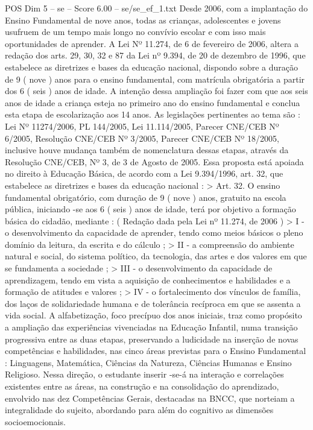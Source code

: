 \begin{textsample}{POS Dim 5 – se – Score 6.00 – se/se\_ef\_1.txt}
Desde 2006, com a implantação do Ensino Fundamental de nove anos, todas as crianças, adolescentes e jovens usufruem de um tempo mais longo no convívio escolar e com isso mais oportunidades de aprender.
A Lei Nº 11.274, de 6 de fevereiro de 2006, altera a redação dos arts. 29, 30, 32 e 87 da Lei nº 9.394, de 20 de dezembro de 1996, que estabelece as diretrizes e bases da educação nacional, dispondo sobre a duração de 9 ( nove ) anos para o ensino fundamental, com matrícula obrigatória a partir dos 6 ( seis ) anos de idade.
A intenção dessa ampliação foi fazer com que aos seis anos de idade a criança esteja no primeiro ano do ensino fundamental e conclua esta etapa de escolarização aos 14 anos.
As legislações pertinentes ao tema são : Lei Nº 11274/2006, PL 144/2005, Lei 11.114/2005, Parecer CNE/CEB Nº 6/2005, Resolução CNE/CEB Nº 3/2005, Parecer CNE/CEB Nº 18/2005, inclusive houve mudança também de nomenclatura dessas etapas, através da Resolução CNE/CEB, Nº 3, de 3 de Agosto de 2005.
Essa proposta está apoiada no direito à Educação Básica, de acordo com a Lei 9.394/1996, art. 32, que estabelece as diretrizes e bases da educação nacional : > Art. 32.
O ensino fundamental obrigatório, com duração de 9 ( nove ) anos, gratuito na escola pública, iniciando -se aos 6 ( seis ) anos de idade, terá por objetivo a formação básica do cidadão, mediante : ( Redação dada pela Lei nº 11.274, de 2006 ) > I - o desenvolvimento da capacidade de aprender, tendo como meios básicos o pleno domínio da leitura, da escrita e do cálculo ; > II - a compreensão do ambiente natural e social, do sistema político, da tecnologia, das artes e dos valores em que se fundamenta a sociedade ; > III - o desenvolvimento da capacidade de aprendizagem, tendo em vista a aquisição de conhecimentos e habilidades e a formação de atitudes e valores ; > IV - o fortalecimento dos vínculos de família, dos laços de solidariedade humana e de tolerância recíproca em que se assenta a vida social.
A alfabetização, foco precípuo dos anos iniciais, traz como propósito a ampliação das experiências vivenciadas na Educação Infantil, numa transição progressiva entre as duas etapas, preservando a ludicidade na inserção de novas competências e habilidades, nas cinco áreas previstas para o Ensino Fundamental : Linguagens, Matemática, Ciências da Natureza, Ciências Humanas e Ensino Religioso.
Nessa direção, o estudante inserir -se-á na interação e correlações existentes entre as áreas, na construção e na consolidação do aprendizado, envolvido nas dez Competências Gerais, destacadas na BNCC, que norteiam a integralidade do sujeito, abordando para além do cognitivo as dimensões socioemocionais.

\end{textsample}
